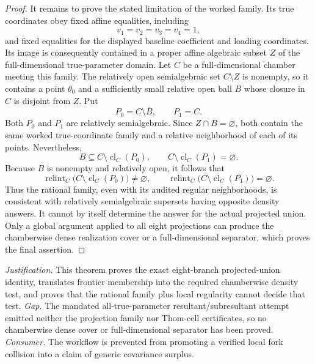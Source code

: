 \documentclass{article}
\begin{document}
\begin{proof}
It remains to prove the stated limitation of the worked family.  Its true
coordinates obey fixed affine equalities, including
\[
 v_1=v_2=v_3=v_4=1,
\]
and fixed equalities for the displayed baseline coefficient and loading
coordinates.  Its image is consequently contained in a proper affine
algebraic subset \(Z\) of the full-dimensional true-parameter domain.  Let
\(C\) be a full-dimensional chamber meeting this family.  The relatively
open semialgebraic set \(C\setminus Z\) is nonempty, so it contains a point
\(\theta_0\) and a sufficiently small relative open ball \(B\) whose closure
in \(C\) is disjoint from \(Z\).  Put
\[
 P_0=C\setminus\overline B,
 \qquad
 P_1=C.
\]
Both \(P_0\) and \(P_1\) are relatively semialgebraic.  Since
\(Z\cap\overline B=\varnothing\), both contain the same worked true-coordinate
family and a relative neighborhood of each of its points.  Nevertheless,
\[
 B\subseteq C\setminus\operatorname{cl}_C(P_0),
 \qquad
 C\setminus\operatorname{cl}_C(P_1)=\varnothing.
\]
Because \(B\) is nonempty and relatively open, it follows that
\[
 \operatorname{relint}_C
 \bigl(C\setminus\operatorname{cl}_C(P_0)\bigr)\ne\varnothing,
 \qquad
 \operatorname{relint}_C
 \bigl(C\setminus\operatorname{cl}_C(P_1)\bigr)=\varnothing.
\]
Thus the rational family, even with its audited regular neighborhoods, is
consistent with relatively semialgebraic supersets having opposite density
answers.  It cannot by itself determine the answer for the actual projected
union.  Only a global argument applied to all eight projections can produce
the chamberwise dense realization cover or a full-dimensional separator,
which proves the final assertion.
\end{proof}
\par\smallskip\noindent \textit{Justification.} This theorem proves the exact eight-branch projected-union identity, translates frontier membership into the required chamberwise density test, and proves that the rational family plus local regularity cannot decide that test. \textit{Gap.} The mandated all-true-parameter resultant/subresultant attempt emitted neither the projection family nor Thom-cell certificates, so no chamberwise dense cover or full-dimensional separator has been proved. \textit{Consumer.} The workflow is prevented from promoting a verified local fork collision into a claim of generic covariance surplus.
\end{document}
